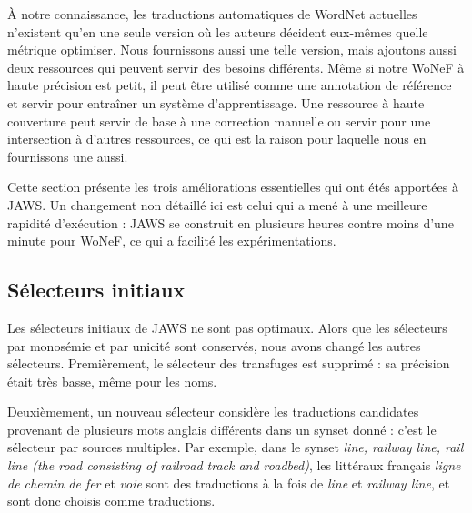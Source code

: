 
À notre connaissance, les traductions automatiques de WordNet actuelles
n'existent qu'en une seule version où les auteurs décident eux-mêmes quelle
métrique optimiser. Nous fournissons aussi une telle version, mais ajoutons
aussi deux ressources qui peuvent servir des besoins différents. Même si notre
WoNeF à haute précision est petit, il peut être utilisé comme une annotation de
référence et servir pour entraîner un système d'apprentissage. Une ressource à
haute couverture peut servir de base à une correction manuelle ou servir pour
une intersection à d'autres ressources, ce qui est la raison pour laquelle nous
en fournissons une aussi.


Cette section présente les trois améliorations essentielles qui ont étés
apportées à JAWS. Un changement non détaillé ici est celui qui a mené à une
meilleure rapidité d'exécution : JAWS se construit en plusieurs heures contre
moins d'une minute pour WoNeF, ce qui a facilité les expérimentations.

\subsection{Sélecteurs initiaux}
\label{subsec:revisiting_extraction_heuristics}


Les sélecteurs initiaux de JAWS ne sont pas optimaux. Alors que les sélecteurs
par monosémie et par unicité sont conservés, nous avons changé les autres
sélecteurs. Premièrement, le sélecteur des transfuges est supprimé : sa
précision était très basse, même pour les noms.

Deuxièmement, un nouveau sélecteur considère les traductions candidates
provenant de plusieurs mots anglais différents dans un synset donné : c'est le
sélecteur par sources multiples. Par exemple, dans le synset \textit{line,
railway line, rail line (the road consisting of railroad track and roadbed)},
les littéraux français \textit{ligne de chemin de fer} et \textit{voie} sont
des traductions à la fois de \textit{line} et \textit{railway line}, et sont
donc choisis comme traductions.

